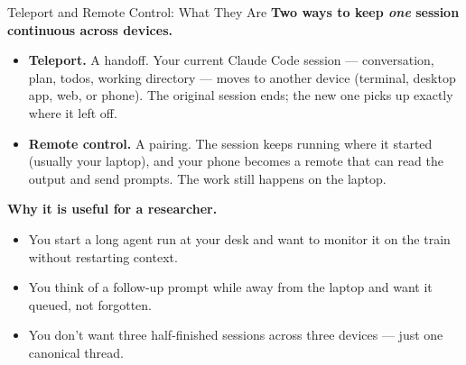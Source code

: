 \documentclass[aspectratio=169, 11pt]{beamer}
\begin{document}
\begin{frame}{Teleport and Remote Control: What They Are}
  \textbf{Two ways to keep \emph{one} session continuous across devices.}

  \vspace{0.7em}
  \begin{itemize}
    \item \textbf{Teleport.} A handoff. Your current Claude Code session --- conversation, plan, todos, working directory --- moves to another device (terminal, desktop app, web, or phone). The original session ends; the new one picks up exactly where it left off.

    \vspace{0.4em}
    \item \textbf{Remote control.} A pairing. The session keeps running where it started (usually your laptop), and your phone becomes a remote that can read the output and send prompts. The work still happens on the laptop.
  \end{itemize}

  \vspace{0.7em}
  \textbf{Why it is useful for a researcher.}
  \begin{itemize}\small
    \item You start a long agent run at your desk and want to monitor it on the train without restarting context.
    \item You think of a follow-up prompt while away from the laptop and want it queued, not forgotten.
    \item You don't want three half-finished sessions across three devices --- just one canonical thread.
  \end{itemize}
\end{frame}
\end{document}
